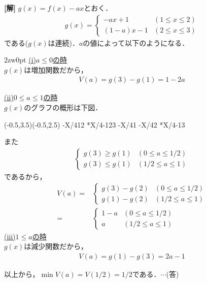 \documentclass[a4j]{jarticle}
\begin{document}
\setlength{\columnseprule}{0.4pt}
\begin{multicols}{2}
{\bf[解]} $g(x)=f(x)-ax$とおく．
          \begin{align*}
          g(x)=
               \begin{cases}
               -ax+1&(1\le x\le 2) \\
               (1-a)x-1&(2\le x\le3)
               \end{cases}
          \end{align*}     
である($g(x)$は連続)．$a$の値によって以下のようになる．\\

     \begin{indentation}{2zw}{0pt}
     \noindent\underline{(i)$a\le0$の時}\\
     $g(x)$は増加関数だから，
          \begin{align*}
          V(a)=g(3)-g(1)=1-2a
          \end{align*}
          
     \noindent\underline{(ii)$0\le a\le 1$の時}\\
     $g(x)$のグラフの概形は下図．
     
          \begin{zahyou}[ul=10mm](-0.5,3.5)(-0.5,2.5)
          \def\Fx{1-X/4}
          \def\Gx{3*X/4-1}
          \def\aval{1}
          \def\bval{2}
          \def\cval{3}
          \YGurafu\Fx{1}{2}
          \YGurafu\Gx{2}{3}
          \YTen\Fx\aval\A
          \YTen\Fx\bval\B
          \YTen\Gx\cval\C
          \Put\A[syaei=xy,xlabel=1,ylabel=1-a]{}
          \Put\B[syaei=xy,xlabel=2,ylabel=1-2a]{}
          \Put\C[syaei=xy,xlabel=3,ylabel=2-3a]{}
          \end{zahyou}
          
     また
          \begin{align*}
               \begin{cases}
               g(3)\ge g(1)&(0\le a\le 1/2) \\
               g(3)\le g(1) &(1/2\le a\le 1)
               \end{cases}
          \end{align*}
     であるから，
          \begin{align*}
          V(a)=&
               \begin{cases}
               g(3)-g(2)&(0\le a\le 1/2)\\
               g(1)-g(2)&(1/2\le a\le 1)
               \end{cases} \\
               =&
               \begin{cases}
               1-a&(0\le a\le 1/2)\\
               a&(1/2\le a\le 1)
               \end{cases}
          \end{align*}
     \noindent\underline{(iii)$1\le a$の時}\\
     $g(x)$は減少関数だから，
          \begin{align*}
          V(a)=g(1)-g(3)=2a-1
          \end{align*}
     \end{indentation}
     
以上から，$\min V(a)=V(1/2)=1/2$である．$\cdots$(答)
\newpage
\end{multicols}
\end{document}
